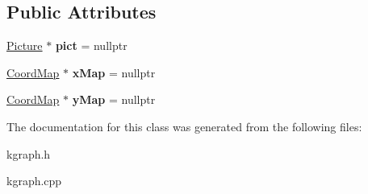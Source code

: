 \subsection*{Public Attributes}
\begin{DoxyCompactItemize}
\item 
\hypertarget{class_k_graph_1_1_canvas_ad91bab653c0812f5ec606b378246f333}{\hyperlink{class_k_graph_1_1_picture}{Picture} $\ast$ {\bfseries pict} = nullptr}\label{class_k_graph_1_1_canvas_ad91bab653c0812f5ec606b378246f333}

\item 
\hypertarget{class_k_graph_1_1_canvas_aff8c683aefb248d19d72670ba3517bb6}{\hyperlink{class_k_graph_1_1_coord_map}{Coord\-Map} $\ast$ {\bfseries x\-Map} = nullptr}\label{class_k_graph_1_1_canvas_aff8c683aefb248d19d72670ba3517bb6}

\item 
\hypertarget{class_k_graph_1_1_canvas_a51397d902fd8cadfd16f0e42cddfc269}{\hyperlink{class_k_graph_1_1_coord_map}{Coord\-Map} $\ast$ {\bfseries y\-Map} = nullptr}\label{class_k_graph_1_1_canvas_a51397d902fd8cadfd16f0e42cddfc269}

\end{DoxyCompactItemize}


The documentation for this class was generated from the following files\-:\begin{DoxyCompactItemize}
\item 
kgraph.\-h\item 
kgraph.\-cpp\end{DoxyCompactItemize}
